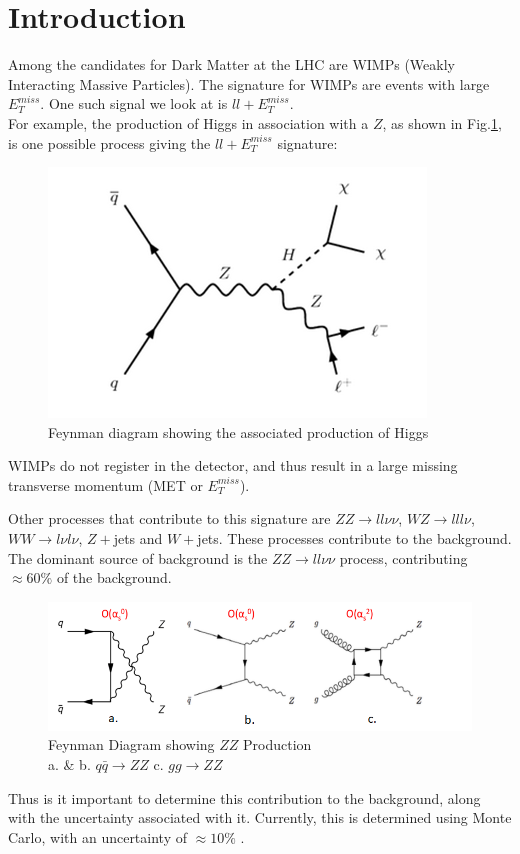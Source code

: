 \documentclass[11pt,a4paper,final]{report}
\begin{document}
\section{Introduction}
Among the candidates for Dark Matter at the LHC are WIMPs (Weakly Interacting Massive Particles). The signature for WIMPs are events with large $E_T^{miss}$. One such signal we look at is $ll+E_T^{miss}$. \\
For example, the production of Higgs in association with a $Z$, as shown in Fig.\ref{HZ}, is one possible process giving the $ll+E_T^{miss}$ signature:
\begin{figure}[H]
	\begin{center}
		\includegraphics[scale=0.7]{HZ.png}
		\caption{Feynman diagram showing the associated production of Higgs}
		\label{HZ}
	\end{center}
\end{figure}
\noindent  WIMPs do not register in the detector, and thus result in a large missing transverse momentum (MET or $E_T^{miss}$).

Other processes that contribute to this signature are $ZZ\rightarrow ll\nu\nu$, $WZ\rightarrow lll\nu$,$WW\rightarrow l\nu l\nu$, $Z+$jets and $W+$jets. These processes contribute to the background. The dominant source of background is the $ZZ \rightarrow ll\nu\nu$ process, contributing $\approx 60 \%$ of the background. 
\begin{figure}[h]
	\begin{center}
		\includegraphics[scale=0.5]{ZZ.png}
		\caption{Feynman Diagram showing $ZZ$ Production \\ a. \& b. $q\bar{q}\rightarrow ZZ$ \hspace{2 cm} c. $gg\rightarrow ZZ$}
		\label{ZZdiag}
	\end{center}
\end{figure}
Thus is it important to determine this contribution to the background, along with the uncertainty associated with it. Currently, this is determined using Monte Carlo, with an uncertainty of $\approx 10\%$ \cite{ZH_ATLAS}.
\end{document}
